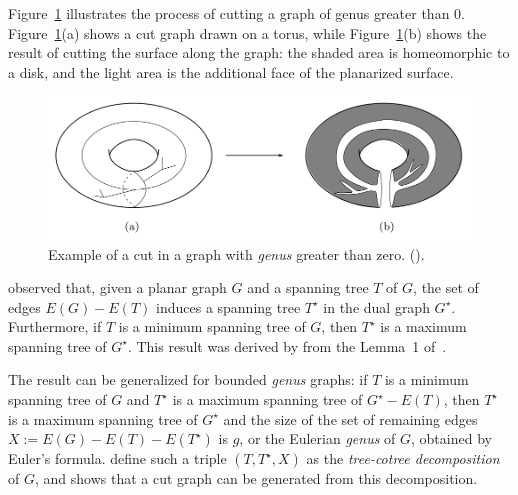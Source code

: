 Figure~\ref{fig:mortar5} illustrates the process of cutting a graph of genus greater than 0.  Figure~\ref{fig:mortar5}(a) shows a cut graph drawn on a torus, while Figure~\ref{fig:mortar5}(b) shows the result of cutting the surface along the graph: the shaded area is homeomorphic to a disk, and the light area is the additional face of the planarized surface.

\begin{figure}[h]
    \centering
    \includegraphics[scale=0.45]{imgs/mortar5.png}
    \caption {Example of a cut in a graph with \textit{genus} greater than zero. (\cite{Borradaile2012}).}
    \label{fig:mortar5}
\end{figure}


\cite{Borradaile2012} observed that, given a planar graph \(G\) and a spanning tree \(T\) of \(G\), the set of edges \(E(G) - E(T)\) induces a spanning tree \(T^{\star}\) in the dual graph \(G^{\star}\). Furthermore, if \(T\) is a minimum spanning tree of \(G\), then \(T^{\star}\) is a maximum spanning tree of \(G^{\star}\). This result was derived by \citeauthor{Borradaile2012} from the Lemma~1 of~\cite{EPPSTEIN199233}.

The result can be generalized for bounded \textit{genus} graphs: if \(T\) is a minimum spanning tree of \(G\) and \(T^{\star}\) is a maximum spanning tree of \(G^{\star} - E(T)\), then \(T^{\star}\) is a maximum spanning tree of \(G^{\star}\) and the size of the set of remaining edges \(X := E(G) - E(T) - E(T^{\star})\) is \(g\), or the Eulerian \textit{genus} of \(G\), obtained by Euler's formula. \cite{Eppstein} define such a triple \((T, T^{\star}, X)\) as the \textit{tree-cotree decomposition} of \(G\), and shows that a cut graph can be generated from this decomposition.

